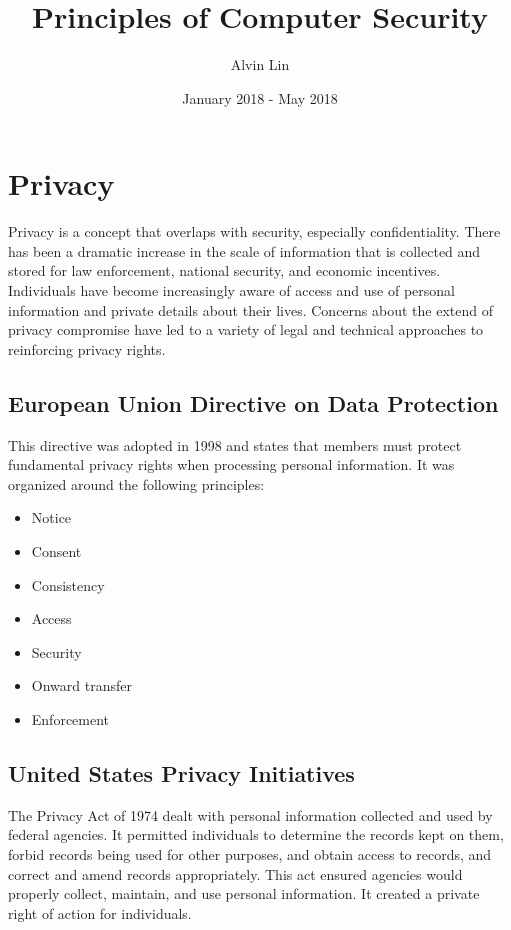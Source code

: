 \documentclass{math}
\title{Principles of Computer Security}
\author{Alvin Lin}
\date{January 2018 - May 2018}
\begin{document}
\maketitle

\section*{Privacy}
Privacy is a concept that overlaps with security, especially confidentiality.
There has been a dramatic increase in the scale of information that is collected
and stored for law enforcement, national security, and economic incentives.
Individuals have become increasingly aware of access and use of personal
information and private details about their lives. Concerns about the extend
of privacy compromise have led to a variety of legal and technical approaches
to reinforcing privacy rights.

\subsection*{European Union Directive on Data Protection}
This directive was adopted in 1998 and states that members must protect
fundamental privacy rights when processing personal information. It was
organized around the following principles:
\begin{itemize}
  \item Notice
  \item Consent
  \item Consistency
  \item Access
  \item Security
  \item Onward transfer
  \item Enforcement
\end{itemize}

\subsection*{United States Privacy Initiatives}
The Privacy Act of 1974 dealt with personal information collected and used by
federal agencies. It permitted individuals to determine the records kept on
them, forbid records being used for other purposes, and obtain access to
records, and correct and amend records appropriately. This act ensured agencies
would properly collect, maintain, and use personal information. It created a
private right of action for individuals.
\end{document}
